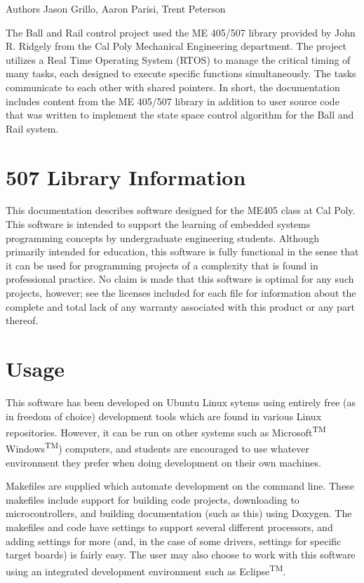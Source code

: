 \begin{DoxyAuthor}{Authors}
Jason Grillo, Aaron Parisi, Trent Peterson
\end{DoxyAuthor}
The Ball and Rail control project used the ME 405/507 library provided by John R. Ridgely from the Cal Poly Mechanical Engineering department. The project utilizes a Real Time Operating System (R\+T\+OS) to manage the critical timing of many tasks, each designed to execute specific functions simultaneously. The tasks communicate to each other with shared pointers. In short, the documentation includes content from the ME 405/507 library in addition to user source code that was written to implement the state space control algorithm for the Ball and Rail system.\hypertarget{index_ME}{}\section{507 Library Information}\label{index_ME}
This documentation describes software designed for the M\+E405 class at Cal Poly. This software is intended to support the learning of embedded systems programming concepts by undergraduate engineering students. Although primarily intended for education, this software is fully functional in the sense that it can be used for programming projects of a complexity that is found in professional practice. No claim is made that this software is optimal for any such projects, however; see the licenses included for each file for information about the complete and total lack of any warranty associated with this product or any part thereof.\hypertarget{index_Usage}{}\section{Usage}\label{index_Usage}
This software has been developed on Ubuntu Linux sytems using entirely free (as in freedom of choice) development tools which are found in various Linux repositories. However, it can be run on other systems such as Microsoft\textsuperscript{TM} Windows\textsuperscript{TM}) computers, and students are encouraged to use whatever environment they prefer when doing development on their own machines.

Makefiles are supplied which automate development on the command line. These makefiles include support for building code projects, downloading to microcontrollers, and building documentation (such as this) using Doxygen. The makefiles and code have settings to support several different processors, and adding settings for more (and, in the case of some drivers, settings for specific target boards) is fairly easy. The user may also choose to work with this software using an integrated development environment such as Eclipse\textsuperscript{TM}.

